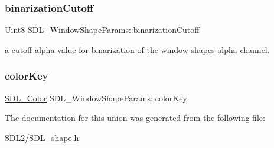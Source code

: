 \subsubsection{\texorpdfstring{binarization\+Cutoff}{binarizationCutoff}}
{\footnotesize\ttfamily \hyperlink{_s_d_l__stdinc_8h_a2944638813a090aa23e62f4da842c3e2}{Uint8} S\+D\+L\+\_\+\+Window\+Shape\+Params\+::binarization\+Cutoff}



a cutoff alpha value for binarization of the window shape\textquotesingle{}s alpha channel. 

\mbox{\label{union_s_d_l___window_shape_params_a8bf3e442a51a1bbf452cfec7c1ed5318}} 
\subsubsection{\texorpdfstring{color\+Key}{colorKey}}
{\footnotesize\ttfamily \hyperlink{struct_s_d_l___color}{S\+D\+L\+\_\+\+Color} S\+D\+L\+\_\+\+Window\+Shape\+Params\+::color\+Key}



The documentation for this union was generated from the following file\+:\begin{DoxyCompactItemize}
\item 
S\+D\+L2/\hyperlink{_s_d_l__shape_8h}{S\+D\+L\+\_\+shape.\+h}\end{DoxyCompactItemize}
